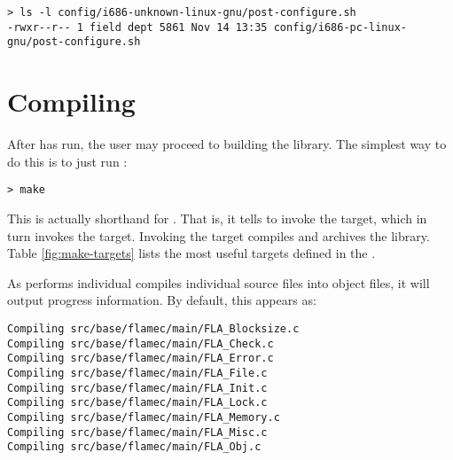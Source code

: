 \begin{Verbatim}[frame=single,framesep=2.5mm,xleftmargin=5mm,commandchars=\\\{\},fontsize=\footnotesize]
> ls -l config/i686-unknown-linux-gnu/post-configure.sh 
-rwxr--r-- 1 field dept 5861 Nov 14 13:35 config/i686-pc-linux-gnu/post-configure.sh
\end{Verbatim}





\section{Compiling}


After \configure has run, the user may proceed to building the library.
The simplest way to do this is to just run \makens:

\begin{Verbatim}[frame=single,framesep=2.5mm,xleftmargin=5mm,commandchars=\\\{\},fontsize=\footnotesize]
> make
\end{Verbatim}

\noindent
This is actually shorthand for \make \allns.
That is, it tells \make to invoke the \all target, which in turn invokes
the \libs target.
Invoking the \libs target compiles and archives the library.
Table \ref{fig:make-targets} lists the most useful \make targets defined
in the \libflame \makefilens.

As \make performs individual compiles individual source files into object
files, it will output progress information.
By default, this appears as:

\begin{Verbatim}[frame=single,framesep=2.5mm,xleftmargin=5mm,commandchars=\\\{\},fontsize=\footnotesize]
Compiling src/base/flamec/main/FLA_Blocksize.c
Compiling src/base/flamec/main/FLA_Check.c
Compiling src/base/flamec/main/FLA_Error.c
Compiling src/base/flamec/main/FLA_File.c
Compiling src/base/flamec/main/FLA_Init.c
Compiling src/base/flamec/main/FLA_Lock.c
Compiling src/base/flamec/main/FLA_Memory.c
Compiling src/base/flamec/main/FLA_Misc.c
Compiling src/base/flamec/main/FLA_Obj.c
\end{Verbatim}

